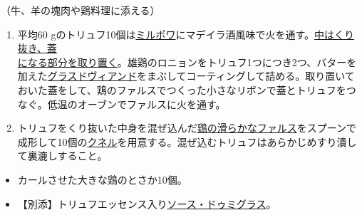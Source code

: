\begin{recette}


（牛、羊の塊肉や鶏料理に添える）

\begin{enumerate}
\def\labelenumi{\arabic{enumi}.}
\item
  平均60
  gのトリュフ10個は\protect\hyperlink{mirepoix}{ミルポワ}にマデイラ酒風味で火を通す。\ul{中はくり抜き、蓋\\になる部分を取り置く}。雄鶏のロニョンをトリュフ1つにつき2つ、バターを加えた\protect\hyperlink{glace-de-viande}{グラスドヴィアンド}をまぶしてコーティングして詰める。取り置いておいた蓋をして、鶏のファルスでつくった小さなリボンで蓋とトリュフをつなぐ。低温のオーブンでファルスに火を通す。
\item
  トリュフをくり抜いた中身を混ぜ込んだ\protect\hyperlink{farce-c}{鶏の滑らかなファルス}をスプーンで成形して10個の\protect\hyperlink{quenelles}{クネル}を用意する。混ぜ込むトリュフはあらかじめすり潰して裏漉しすること。
\end{enumerate}

\begin{itemize}
\item
  カールさせた大きな鶏のとさか10個。
\item
  【別添】トリュフエッセンス入り\protect\hyperlink{sauce-demi-glace}{ソース・ドゥミグラス}。
\end{itemize}

\atoaki{}

\hypertarget{garniture-macedoine}{%
}
\end{recette}
